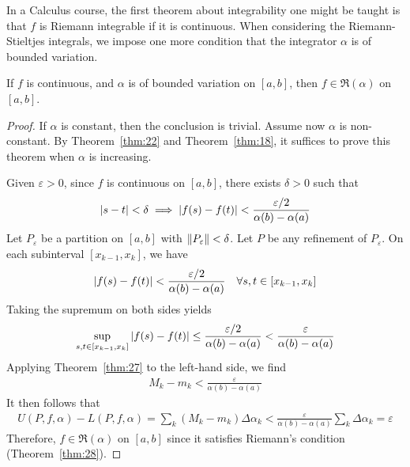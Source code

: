 \documentclass[thmcnt=section, 12pt]{my-elegantbook}
\begin{document}
In a Calculus course, 
the first theorem about integrability one might be taught is 
that $ f $ is Riemann integrable if it is continuous.
When considering the Riemann-Stieltjes integrals,
we impose one more condition that the integrator
$ \alpha $ is of bounded variation.

\begin{theorem} \label{thm:75}
	If $f$ is continuous, 
	and $\alpha$ is of bounded variation on $[a, b]$,
	then $f \in \mathfrak{R}(\alpha)$ on $[a, b]$.
\end{theorem}

\begin{proof}
	If $\alpha$ is constant, then the conclusion is trivial.
	Assume now $ \alpha $ is non-constant.
	By Theorem~\ref{thm:22} and Theorem~\ref{thm:18}, 
	it suffices to prove this theorem when $ \alpha $ is increasing.
	
	Given $ \varepsilon > 0 $,
	since $ f $ is continuous on $ [a, b] $,
	there exists $ \delta > 0 $ such that 
	\begin{align*}
		\left\lvert s - t \right\rvert < \delta
		\implies \left\lvert f(s) - f(t) \right\rvert < \frac{ \varepsilon / 2 }{
			\alpha(b) - \alpha(a)
		}
	\end{align*}
	Let $ P_{ \varepsilon } $ be a partition on $ [a, b] $ with 
	$ \left\lVert P_\varepsilon \right\rVert < \delta $.
	Let $ P $ be any refinement of $ P_\varepsilon $.
	On each subinterval $ [x_{k-1}, x_k] $, we have 
	\begin{align*}
		\left\lvert f(s) - f(t) \right\rvert < \frac{ \varepsilon / 2 }{ 
			\alpha(b) - \alpha(a) 
		}
		\quad \forall s, t \in [x_{k-1}, x_k]
	\end{align*}
	Taking the supremum on both sides yields
	\begin{align*}
		\sup_{s,t \in [x_{k-1}, x_k]} \left\lvert f(s) - f(t) \right\rvert
		\leq \frac{ \varepsilon / 2 }{ 
			\alpha(b) - \alpha(a) 
		} < \frac{ \varepsilon }{ 
			\alpha(b) - \alpha(a) 
		}
	\end{align*}
	Applying Theorem~\ref{thm:27} to the left-hand side, we find 
	\begin{align*}
		M_k - m_k < \frac{ \varepsilon }{ 
			\alpha(b) - \alpha(a) 
		}
	\end{align*}
	It then follows that 
	\begin{align*}
		U(P,f, \alpha) - L(P,f, \alpha)
		= \sum_{k} (M_k - m_k) \Delta \alpha_k
		< \frac{ \varepsilon }{ \alpha(b) - \alpha(a) }
			\sum_{k} \Delta \alpha_k
		= \varepsilon
	\end{align*}
	Therefore, $ f \in \mathfrak{R}(\alpha) $ on $ [a, b] $
	since it satisfies Riemann's condition (Theorem~\ref{thm:28}).
\end{proof}
\end{document}

